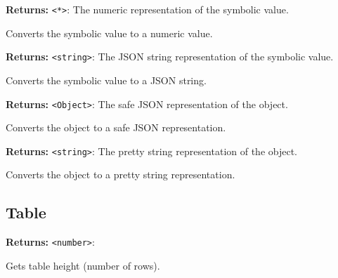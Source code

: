 \documentclass[12pt,a4paper]{article}
\begin{document}
\vspace{5mm}
\noindent {}


\noindent \textbf{Returns:} \texttt{<*>}: The numeric representation of the symbolic value.

\noindent Converts the symbolic value to a numeric value.

\vspace{5mm}
\noindent {}


\noindent \textbf{Returns:} \texttt{<string>}: The JSON string representation of the symbolic value.

\noindent Converts the symbolic value to a JSON string.

\vspace{5mm}
\noindent {}


\noindent \textbf{Returns:} \texttt{<Object>}: The safe JSON representation of the object.

\noindent Converts the object to a safe JSON representation.

\vspace{5mm}
\noindent {}


\noindent \textbf{Returns:} \texttt{<string>}: The pretty string representation of the object.

\noindent Converts the object to a pretty string representation.


\subsection{Table}
\vspace{5mm}
\noindent {}


\noindent \textbf{Returns:} \texttt{<number>}:

\noindent Gets table height (number of rows).
\end{document}
